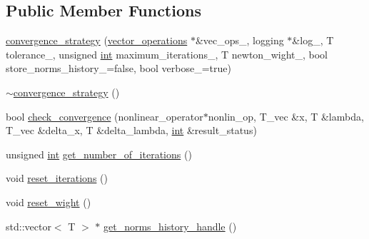 \subsection*{Public Member Functions}
\begin{DoxyCompactItemize}
\item 
\hyperlink{classcontinuation_1_1newton__method__extended_1_1convergence__strategy_a445baea2c85ff055bd56cf759137b348}{convergence\-\_\-strategy} (\hyperlink{container__test_8cpp_aca3cc0310428d338f3a165c7823d6499}{vector\-\_\-operations} $\ast$\&vec\-\_\-ops\-\_\-, logging $\ast$\&log\-\_\-, T tolerance\-\_\-, unsigned \hyperlink{classint}{int} maximum\-\_\-iterations\-\_\-, T newton\-\_\-wight\-\_\-, bool store\-\_\-norms\-\_\-history\-\_\-=false, bool verbose\-\_\-=true)
\item 
\hyperlink{classcontinuation_1_1newton__method__extended_1_1convergence__strategy_aa825f21fb3d1a30084300840aae2597d}{$\sim$convergence\-\_\-strategy} ()
\item 
bool \hyperlink{classcontinuation_1_1newton__method__extended_1_1convergence__strategy_a054b5c56e77943cedf093b6e6513cb64}{check\-\_\-convergence} (nonlinear\-\_\-operator$\ast$nonlin\-\_\-op, T\-\_\-vec \&x, T \&lambda, T\-\_\-vec \&delta\-\_\-x, T \&delta\-\_\-lambda, \hyperlink{classint}{int} \&result\-\_\-status)
\item 
unsigned \hyperlink{classint}{int} \hyperlink{classcontinuation_1_1newton__method__extended_1_1convergence__strategy_a2df8e2aee0729595a75f05af99a4ad52}{get\-\_\-number\-\_\-of\-\_\-iterations} ()
\item 
void \hyperlink{classcontinuation_1_1newton__method__extended_1_1convergence__strategy_aac6e6e797796f2140672e5a9e5b548ca}{reset\-\_\-iterations} ()
\item 
void \hyperlink{classcontinuation_1_1newton__method__extended_1_1convergence__strategy_ac2970259c99acefb3ab55dbceaae94d2}{reset\-\_\-wight} ()
\item 
std\-::vector$<$ T $>$ $\ast$ \hyperlink{classcontinuation_1_1newton__method__extended_1_1convergence__strategy_ad3d8047988b42c57ad698321ea3eb065}{get\-\_\-norms\-\_\-history\-\_\-handle} ()
\end{DoxyCompactItemize}


